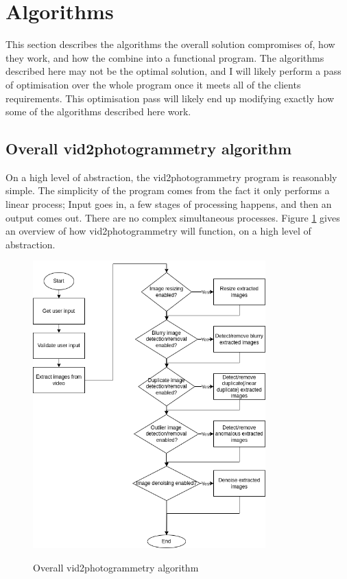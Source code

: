 \documentclass[11pt]{report}
\begin{document}
\section{Algorithms}
This section describes the algorithms the overall solution compromises of, how they work, and how the combine into a functional program. The algorithms described here may not be the optimal solution, and I will likely perform a pass of optimisation over the whole program once it meets all of the clients requirements. This optimisation pass will likely end up modifying exactly how some of the algorithms described here work.
\subsection{Overall vid2photogrammetry algorithm}
On a high level of abstraction, the vid2photogrammetry program is reasonably simple. The simplicity of the program comes from the fact it only performs a linear process; Input goes in, a few stages of processing happens, and then an output comes out. There are no complex simultaneous processes.
Figure \ref{fig:overallAlgorithm} gives an overview of how vid2photogrammetry will function, on a high level of abstraction.
\begin{figure}[h!]
	\centering
	\caption{Overall vid2photogrammetry algorithm}
	\includegraphics[width=0.8\textwidth]{designDiagrams/overallAlgorithm}
	\label{fig:overallAlgorithm}
\end{figure}
\end{document}
